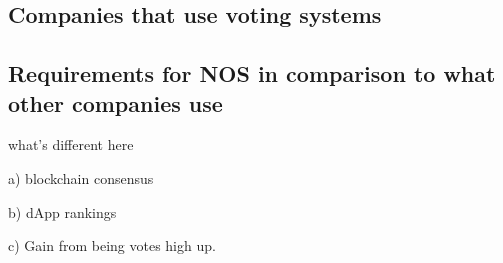
\subsection{Companies that use voting systems}

\subsection{Requirements for NOS in comparison to what other companies use}
what's different here 

a) blockchain consensus 

b) dApp rankings 

c) Gain from being votes high up.
